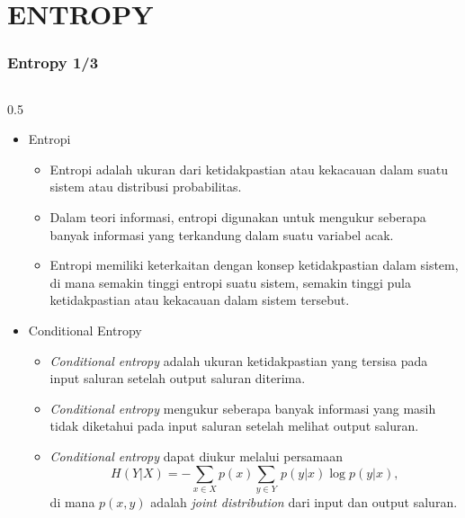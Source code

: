 \section{ENTROPY}
\begin{frame}
    \frametitle{Entropy 1/3}
       \vspace*{-0.5cm}
  \begin{columns}[T]
  \small
    \begin{column}{0.5\textwidth}
        \begin{itemize}
            \item Entropi \cite{djordjevic2019physical}\\
                \begin{itemize}
                \tiny \justifying                
                    \item[$\Rightarrow$] Entropi adalah ukuran dari ketidakpastian atau kekacauan dalam suatu sistem atau distribusi probabilitas.
                    \item[$\Rightarrow$]  Dalam teori informasi, entropi digunakan untuk mengukur seberapa banyak informasi yang terkandung dalam suatu variabel acak. 
                    \item[$\Rightarrow$] Entropi memiliki keterkaitan dengan konsep ketidakpastian dalam sistem, di mana semakin tinggi entropi suatu sistem, semakin tinggi pula ketidakpastian atau kekacauan dalam sistem tersebut.
                \end{itemize}
            \item Conditional Entropy\\
                \begin{itemize}
                \tiny \justifying
                    \item[$\Rightarrow$] \textit{Conditional entropy} adalah ukuran ketidakpastian yang tersisa pada input saluran setelah output saluran diterima.
                    \item[$\Rightarrow$]  \textit{Conditional entropy} mengukur seberapa banyak informasi yang masih tidak diketahui pada input saluran setelah melihat output saluran.
                    \item[$\Rightarrow$] \textit{Conditional entropy} dapat diukur melalui persamaan
                        \begin{equation}
                            H(Y|X) = -\sum_{x \in X} p(x) \sum_{y \in Y}  \, p(y|x) \log p(y|x),
                        \end{equation}
                     di mana $p(x,y)$ adalah \textit{joint distribution} dari input dan output saluran.
                \end{itemize}
        \end{itemize}
    \end{column}


\end{columns}
\end{frame}
